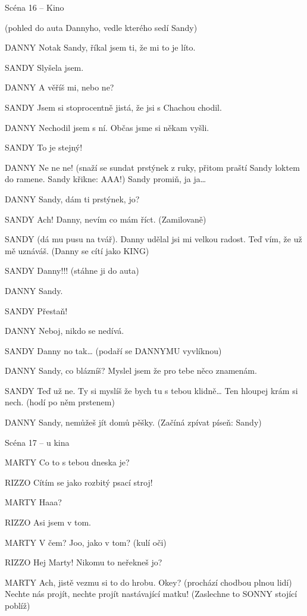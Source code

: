 Scéna 16  – Kino 

(pohled do auta Dannyho, vedle kterého sedí Sandy)

DANNY        Notak Sandy, říkal jsem ti, že mi to je líto. 

SANDY        Slyšela jsem. 

DANNY        A věříš mi, nebo ne?

SANDY        Jsem si stoprocentně jistá, že jsi s Chachou chodil. 

DANNY        Nechodil jsem s ní. Občas jsme si někam vyšli.

SANDY        To je stejný!

DANNY        Ne ne ne! (snaží se sundat prstýnek z ruky, přitom praští Sandy loktem         do ramene. Sandy křikne: AAA!) Sandy promiň, ja ja…

DANNY        Sandy, dám ti prstýnek, jo?

SANDY        Ach! Danny, nevím co mám říct. (Zamilovaně)

SANDY        (dá mu pusu na tvář). Danny udělal jsi mi velkou radost. Teď vím, že už mě uznáváš. (Danny se cítí jako KING)

SANDY        Danny!!! (stáhne ji do auta)

DANNY        Sandy. 

SANDY        Přestaň!

DANNY        Neboj, nikdo se nedívá. 

SANDY        Danny no tak… (podaří se DANNYMU vyvlíknou)

DANNY        Sandy, co blázníš? Myslel jsem že pro tebe něco znamenám. 

SANDY        Teď už ne. Ty si myslíš že bych tu s tebou klidně… Ten hloupej krám si         nech. (hodí po něm prstenem)

DANNY        Sandy, nemůžeš jít domů pěšky. (Začíná zpívat píseň: Sandy)





 Scéna 17  – u kina 

MARTY        Co to s tebou dneska je?

RIZZO        Cítím se jako rozbitý psací stroj! 

MARTY        Haaa?

RIZZO        Asi jsem v tom.

MARTY        V čem? Joo, jako  v tom? (kulí oči)

RIZZO        Hej Marty! Nikomu to neřekneš jo?

MARTY        Ach, jistě vezmu si to do hrobu. Okey? (prochází chodbou plnou lidí)         Nechte nás projít, nechte projít nastávající matku! (Zaslechne to         SONNY stojící poblíž)

